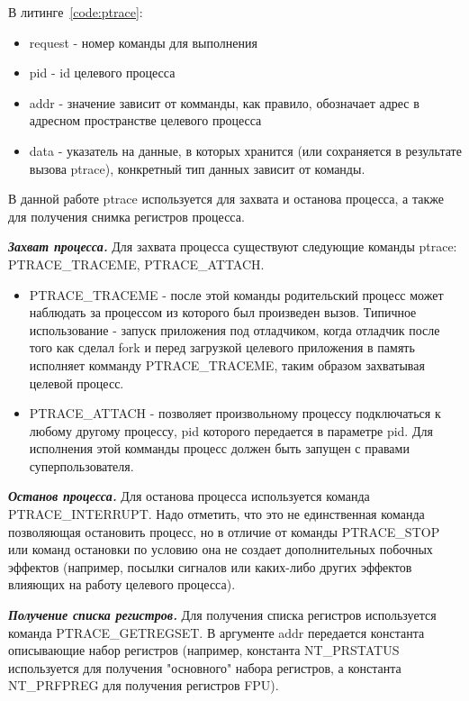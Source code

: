 В литинге~\ref{code:ptrace}:

\begin{itemize}

    \item request - номер команды для выполнения
    \item pid - id целевого процесса
    \item addr - значение зависит от комманды, как правило, обозначает адрес в адресном пространстве целевого процесса
    \item data - указатель на данные, в которых хранится (или сохраняется в результате вызова ptrace), конкретный тип данных зависит от команды.

\end{itemize}

В данной работе ptrace используется для захвата и останова процесса, а также для получения снимка регистров процесса.

\textbf{\textit{Захват процесса.}} Для захвата процесса существуют следующие команды ptrace: PTRACE\_TRACEME, PTRACE\_ATTACH.

\begin{itemize}

    \item PTRACE\_TRACEME - после этой команды родительский процесс может наблюдать за процессом из которого был произведен вызов. Типичное использование - запуск приложения под отладчиком, когда отладчик после того как сделал fork и перед загрузкой целевого приложения в память исполняет комманду PTRACE\_TRACEME, таким образом захватывая целевой процесс.

    \item PTRACE\_ATTACH - позволяет произвольному процессу подключаться к любому другому процессу, pid которого передается в параметре pid. Для исполнения этой комманды процесс должен быть запущен с правами суперпользователя.

\end{itemize}

\textbf{\textit{Останов процесса.}} Для останова процесса используется команда PTRACE\_INTERRUPT. Надо отметить, что это не единственная команда позволяющая остановить процесс, но в отличие от команды PTRACE\_STOP или команд остановки по условию она не создает дополнительных побочных эффектов (например, посылки сигналов или каких-либо других эффектов влияющих на работу целевого процесса).

\textbf{\textit{Получение списка регистров.}} Для получения списка регистров используется команда PTRACE\_GETREGSET. В аргументе addr передается константа описывающие набор регистров (например, константа NT\_PRSTATUS используется для получения "основного" набора регистров, а константа NT\_PRFPREG для получения регистров FPU).

